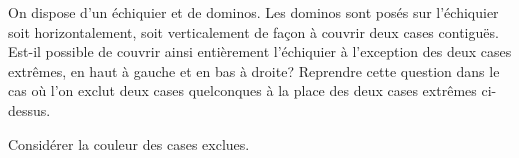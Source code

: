 \exercice{}  
\enonce
On dispose d'un \'echiquier et de dominos. Les dominos sont pos\'es sur
l'\'echiquier soit horizontalement, soit verticalement de fa\c con \`a couvrir deux cases
contigu\"es. Est-il possible de couvrir ainsi enti\`erement l'\'echiquier \`a l'exception
des deux cases extr\^emes, en haut \`a gauche et en bas \`a droite?
Reprendre cette question dans le cas o\`u l'on exclut deux cases quelconques \`a la place des deux cases
extr\^emes ci-dessus.
\finenonce 

\indication
Consid\'erer la couleur des cases exclues.
\finindication

\nocorrection

\finexercice
